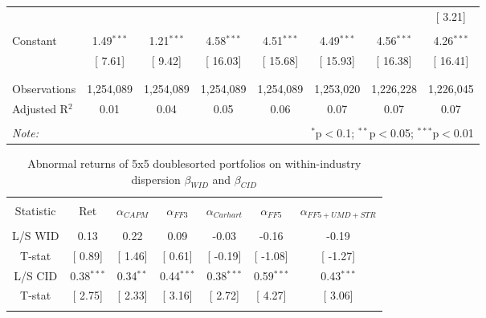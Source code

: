 \documentclass[12pt]{article}
\begin{document}
\begin{table}[!htbp]
\begin{tabular}{@{\extracolsep{0pt}}lccccccc}
  &  &  &  &  &  &  & [ 3.21] \\ 
  & & & & & & & \\ 
 Constant & 1.49$^{***}$ & 1.21$^{***}$ & 4.58$^{***}$ & 4.51$^{***}$ & 4.49$^{***}$ & 4.56$^{***}$ & 4.26$^{***}$ \\ 
  & [ 7.61] & [ 9.42] & [ 16.03] & [ 15.68] & [ 15.93] & [ 16.38] & [ 16.41] \\ 
  & & & & & & & \\ 
\hline \\[-1.8ex] 
Observations & 1,254,089 & 1,254,089 & 1,254,089 & 1,254,089 & 1,253,020 & 1,226,228 & 1,226,045 \\ 
Adjusted R$^{2}$ & 0.01 & 0.04 & 0.05 & 0.06 & 0.07 & 0.07 & 0.07 \\ 
\hline 
\hline \\[-1.8ex] 
\textit{Note:}  & \multicolumn{7}{r}{$^{*}$p$<$0.1; $^{**}$p$<$0.05; $^{***}$p$<$0.01} \\ 
\end{tabular} 
\end{table}


\clearpage


\begin{table}[!htbp] \centering 
  \caption{Abnormal returns of 5x5 doublesorted portfolios on within-industry dispersion $\beta_{WID}$ and $\beta_{CID}$} 
  \label{} 
\begin{tabular}{@{\extracolsep{5pt}} ccccccc} 
\\[-1.8ex]\hline 
\hline \\[-1.8ex] 
Statistic & Ret & $\alpha_{CAPM}$ & $\alpha_{FF3}$ & $\alpha_{Carhart}$ & $\alpha_{FF5}$ & $\alpha_{FF5+UMD+STR}$ \\ 
\hline \\[-1.8ex] 
L/S WID & 0.13 & 0.22 & 0.09 & -0.03 & -0.16 & -0.19 \\ 
T-stat & [ 0.89] & [ 1.46] & [ 0.61] & [ -0.19] & [ -1.08] & [ -1.27] \\ 
L/S CID & 0.38$^{***}$ & 0.34$^{**}$ & 0.44$^{***}$ & 0.38$^{***}$ & 0.59$^{***}$ & 0.43$^{***}$ \\ 
T-stat & [ 2.75] & [ 2.33] & [ 3.16] & [ 2.72] & [ 4.27] & [ 3.06] \\ 
\hline \\[-1.8ex] 
\end{tabular} 
\end{table}
\end{document}
